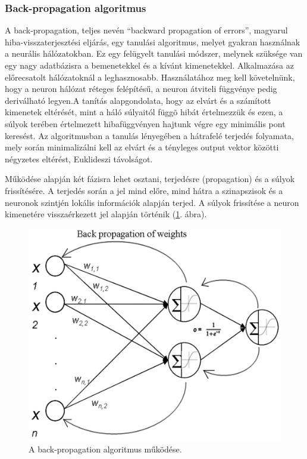 \documentclass[a4paper]{article}
\begin{document}
\subsubsection{Back-propagation algoritmus}
A back-propagation, teljes nevén ``backward propagation of errors'', magyarul hiba-visszaterjesztési eljárás, egy tanulási algoritmus, melyet gyakran használnak a neurális hálózatokban. Ez egy felügyelt tanulási módszer, melynek szüksége van egy nagy adatbázisra a bemenetekkel és a kívánt kimenetekkel. Alkalmazása az előrecsatolt hálózatoknál a leghasznosabb. Használatához meg kell követelnünk, hogy a neuron hálózat réteges felépítésű, a neuron átviteli függvénye pedig deriválható legyen.A tanítás alapgondolata, hogy az elvárt és a számított kimenetek eltérését, mint a háló súlyaitól függõ hibát értelmezzük és ezen, a súlyok terében értelmezett hibafüggvényen hajtunk végre egy minimális pont keresést. Az algoritmusban a tanulás lényegében a hátrafelé terjedés folyamata, mely során minimalizálni kell az elvárt és a tényleges output vektor közötti négyzetes eltérést, Euklideszi távolságot.

Működése alapján két fázisra lehet osztani, terjedésre (propagation) és a súlyok frissítésére. A terjedés során a jel mind előre, mind hátra a szinapszisok és a neuronok szintjén lokális információk alapján terjed. A súlyok frissítése a neuron kimenetére visszaérkezett jel alapján történik (\ref{backpropagation}. ábra).

\begin{figure}
  \centering
  \includegraphics[scale=0.8]{backpropagation}
  \caption{A back-propagation algoritmus működése.}
  \label{backpropagation}
\end{figure}
\end{document}
